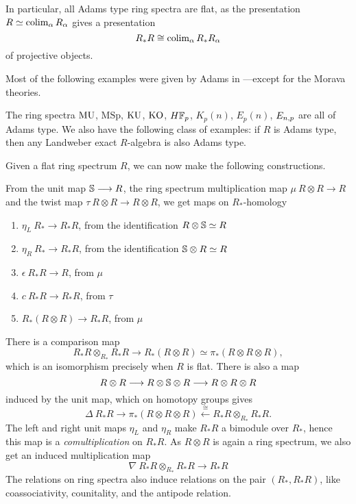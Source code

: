 \begin{remark}
    In particular, all Adams type ring spectra are flat, as the presentation $R\simeq \colim_\alpha R_\alpha$ gives a presentation
    \[R_*R\cong \colim_\alpha R_*R_\alpha\] 
    of projective objects. 
\end{remark}

Most of the following examples were given by Adams in \cite[III.13.4]{adams_74}---except for the Morava theories.

\begin{example}
    \label{ch0:ex:adams-type-ring-spectra}
    The ring spectra $\MU$, $\mathrm{MSp}$, $\KU$, $\KO$, $H\F_p$, $K_p(n)$, $E_p(n)$, $E\np$ are all of Adams type. We also have the following class of examples: if $R$ is Adams type, then any Landweber exact $R$-algebra is also Adams type. 
\end{example}

Given a flat ring spectrum $R$, we can now make the following constructions. 

\begin{construction}
    \label{ch0:const:hopf-algebroid-maps-from-spectra}
    From the unit map $\S\longrightarrow R$, the ring spectrum multiplication map $\mu\: R\otimes R\longrightarrow R$ and the twist map $\tau\: R\otimes R\longrightarrow R\otimes R$, we get maps on $R_*$-homology
    \begin{enumerate}
        \item $\eta_L\: R_*\longrightarrow R_*R$, from the identification $R\otimes \S\simeq R$
        \item $\eta_R\: R_*\longrightarrow R_*R$, from the identification $\S\otimes R\simeq R$
        \item $\epsilon\: R_*R\longrightarrow R$, from $\mu$
        \item $c\: R_*R\longrightarrow R_*R$, from $\tau$
        \item $R_*(R\otimes R)\longrightarrow R_*R$, from $\mu$
    \end{enumerate}
    There is a comparison map
    \[R_*R\otimes_{R_*}R_*R\longrightarrow R_*(R\otimes R)\simeq \pi_*(R\otimes R\otimes R),\]
    which is an isomorphism precisely when $R$ is flat. There is also a map 
    \[R\otimes R \to R\otimes \S \otimes R \to R\otimes R\otimes R\]
    induced by the unit map, which on homotopy groups gives 
    \[\Delta\: R_*R \to \pi_*(R\otimes R\otimes R)\overset{\cong}\longleftarrow R_*R\otimes_{R_*}R_*R.\]
    The left and right unit maps $\eta_L$ and $\eta_R$ make $R_*R$ a bimodule over $R_*$, hence this map is a \emph{comultiplication} on $R_*R$. As $R\otimes R$ is again a ring spectrum, we also get an induced multiplication map  
    \[\nabla \: R_*R\otimes_{R_*}R_*R\longrightarrow R_*R\]
    The relations on ring spectra also induce relations on the pair $(R_*, R_*R)$, like coassociativity, counitality, and the antipode relation.   
\end{construction}

